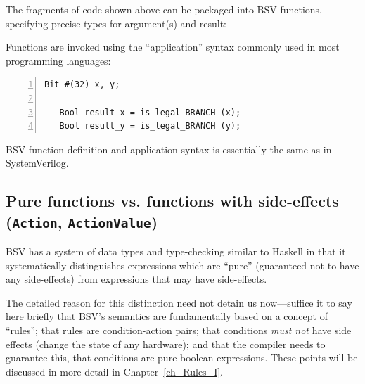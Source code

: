 \label{BSV_functions}


The fragments of code shown above can be packaged into BSV functions,
specifying precise types for argument(s) and result:






Functions are invoked using the ``application'' syntax commonly used
in most programming languages:

{\small
\begin{Verbatim}[frame=single, numbers=left]
   Bit #(32) x, y;

   Bool result_x = is_legal_BRANCH (x);
   Bool result_y = is_legal_BRANCH (y);
\end{Verbatim}
}

BSV function definition and application syntax is essentially the same
as in SystemVerilog.


\subsection{Pure functions vs. functions with side-effects ({\tt Action}, {\tt ActionValue})}

\label{Sec_Pure_vs_Side_Effect_functions}


BSV has a system of data types and type-checking similar to Haskell in
that it systematically distinguishes expressions which are ``pure''
(guaranteed not to have any side-effects) from expressions that may
have side-effects.

The detailed reason for this distinction need not detain us
now---suffice it to say here briefly that BSV's semantics are
fundamentally based on a concept of ``rules''; that rules are
condition-action pairs; that conditions \emph{must not} have side
effects (change the state of any hardware); and that the compiler
needs to guarantee this, {\ie} that conditions are pure boolean
expressions.  These points will be discussed in more detail in
Chapter~\ref{ch_Rules_I}.

